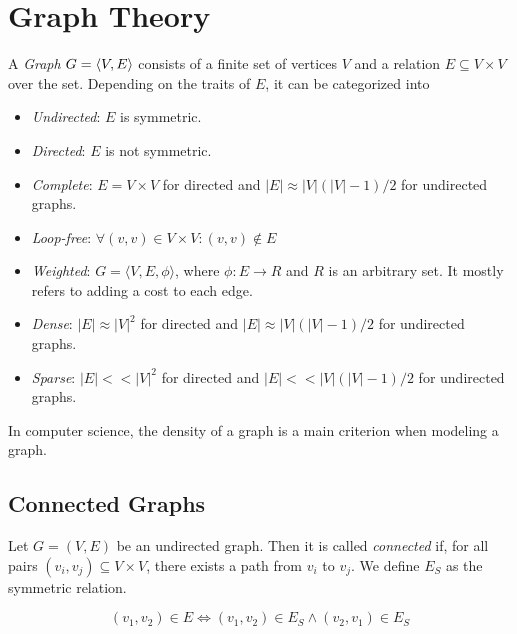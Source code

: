 \chapter{Graph Theory}

 A \emph{Graph} \(G = \left\langle V, E\right\rangle \) consists of a finite set of vertices \(V\) and a relation 
 \(E \subseteq V \times V\) over the set. Depending on the traits of \(E\), it can be categorized into 

 \begin{itemize}
    
    \item \emph{Undirected}: \(E\) is symmetric.

    \item \emph{Directed}: \(E\) is not symmetric.

    \item \emph{Complete}: \(E = V \times V\) for directed and \(|E| \approx |V| (|V| - 1) / 2\) for undirected graphs.
    
    \item \emph{Loop-free}: \(\forall(v,v) \in V \times V : (v,v) \notin E \)

    \item \emph{Weighted}: \(G = \langle V, E, \phi \rangle\), where \(\phi: E \to R\) and \(R\) is an arbitrary set.
    It mostly refers to adding a cost to each edge.
    
    \item \emph{Dense}: \(|E| \approx |V|^2\) for directed and \(|E| \approx |V| (|V| - 1) / 2\) for undirected graphs.

    \item \emph{Sparse}: \(|E| << |V|^2\) for directed and \(|E| << |V| (|V| - 1) / 2\) for undirected graphs.

 \end{itemize}

 In computer science, the density of a graph is a main criterion when modeling a graph. 

 \section{Connected Graphs}

 Let \(G = (V,E)\) be an undirected graph. Then it is called \emph{connected} if, for all pairs \((v_i, v_j) \subseteq V \times V\), there exists a 
 path from \(v_i\) to \(v_j\). We define \(E_S\) as the symmetric relation. 

 \[
    (v_1, v_2) \in E \iff (v_1, v_2) \in E_S \land (v_2, v_1) \in E_S
 \]

